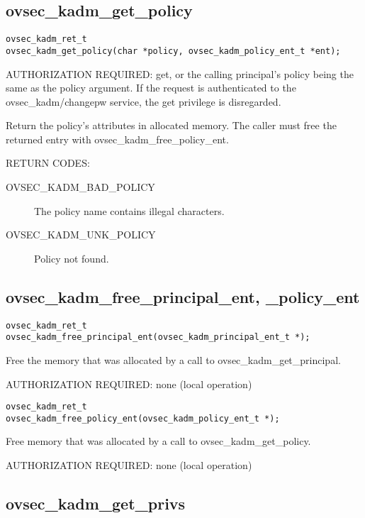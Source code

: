 \subsection{ovsec_kadm_get_policy}

\begin{verbatim}
ovsec_kadm_ret_t
ovsec_kadm_get_policy(char *policy, ovsec_kadm_policy_ent_t *ent); 
\end{verbatim}

AUTHORIZATION REQUIRED: get, or the calling principal's policy being
the same as the policy argument.  If the request is authenticated to
the ovsec_kadm/changepw service, the get privilege is disregarded.

Return the policy's attributes in allocated memory.  The caller must
free the returned entry with ovsec_kadm_free_policy_ent.

RETURN CODES: 

\begin{description}
\item[OVSEC_KADM_BAD_POLICY] The policy name contains illegal characters.
\item[OVSEC_KADM_UNK_POLICY] Policy not found.
\end{description}

\subsection{ovsec_kadm_free_principal_ent, _policy_ent}

\begin{verbatim}
ovsec_kadm_ret_t
ovsec_kadm_free_principal_ent(ovsec_kadm_principal_ent_t *);
\end{verbatim}

Free the memory that was allocated by a call to
ovsec_kadm_get_principal. 

AUTHORIZATION REQUIRED: none (local operation)

\begin{verbatim}
ovsec_kadm_ret_t
ovsec_kadm_free_policy_ent(ovsec_kadm_policy_ent_t *);
\end{verbatim}

Free memory that was allocated by a call to ovsec_kadm_get_policy.

AUTHORIZATION REQUIRED: none (local operation)

\subsection{ovsec_kadm_get_privs}

